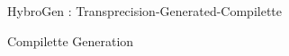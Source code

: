 \begin{Frame}{HybroGen : Transprecision-Generated-Compilette}
  \begin{block}{Compilette Generation}
    
  \end{block}

\end{Frame}
